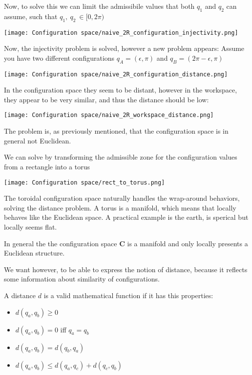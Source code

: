 \begin{example}
    Now, to solve this we can limit the admissibile values that both $q_1$ and $q_2$ can assume, such that $q_1, \ q_2 \ \in [0,2\pi)$

    \begin{center}
        \texttt{[image: Configuration space/naive\_2R\_configuration\_injectivity.png]}
    \end{center}

    Now, the injectivity problem is solved, however a new problem appears:
    Assume you have two different configurations $q_A = (\epsilon,\pi)$ and $q_B = (2\pi-\epsilon,\pi)$

    \begin{center}
        \texttt{[image: Configuration space/naive\_2R\_configuration\_distance.png]}
    \end{center}

    In the configuration space they seem to be distant, however in the workspace, they appear to be very similar, and thus the distance should be low:

    \begin{center}
        \texttt{[image: Configuration space/naive\_2R\_workspace\_distance.png]}
    \end{center}

    The problem is, as previously mentioned, that the configuration space is in general not Euclidean.

    We can solve by transforming the admissible zone for the configuration values from a rectangle into a torus

    \begin{center}
        \texttt{[image: Configuration space/rect\_to\_torus.png]}
    \end{center}

    The toroidal configuration space naturally handles the wrap-around behaviors, solving the distance problem.
    A torus is a manifold, which means that locally behaves like the Euclidean space.
    A practical example is the earth, is sperical but locally seems flat.
\end{example}

In general the the configuration space $\mathbf{C}$ is a manifold and only locally presents a Euclidean structure.

We want however, to be able to express the notion of distance, because it reflects some information about similarity of configurations.

\begin{definition}
    A distance $d$ is a valid mathematical function if it has this properties:
    \begin{itemize}
        \item $d(q_a,q_b) \geq 0$
        \item  $d(q_a,q_b) = 0$ iff $q_a = q_b$
        \item $d(q_a,q_b) = d(q_b,q_a)$
        \item $d(q_a,q_b) \leq d(q_a,q_c) + d(q_c,q_b)$
    \end{itemize}
\end{definition}

